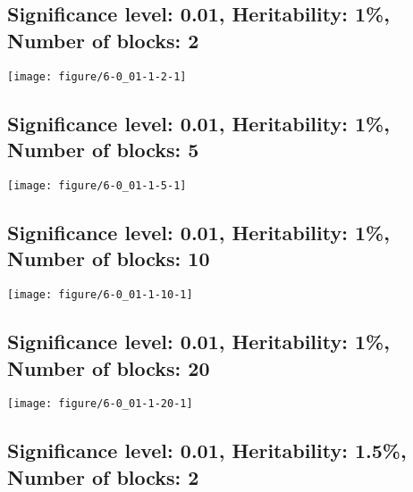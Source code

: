 \documentclass[11pt,letter]{article}\usepackage[]{graphicx}\usepackage[]{color}
\makeatletter
\def\maxwidth{ %
  \ifdim\Gin@nat@width>\linewidth
    \linewidth
  \else
    \Gin@nat@width
  \fi
}
\newenvironment{knitrout}{}{} %
\makeatother
\begin{document}
\newpage
\subsection{Significance level: 0.01, Heritability: 1\%, Number of blocks: 2}

\begin{knitrout}
\color{fgcolor}
\texttt{[image: figure/6-0\_01-1-2-1]} 

\end{knitrout}

\newpage
\subsection{Significance level: 0.01, Heritability: 1\%, Number of blocks: 5}

\begin{knitrout}
\color{fgcolor}
\texttt{[image: figure/6-0\_01-1-5-1]} 

\end{knitrout}

\newpage
\subsection{Significance level: 0.01, Heritability: 1\%, Number of blocks: 10}

\begin{knitrout}
\color{fgcolor}
\texttt{[image: figure/6-0\_01-1-10-1]} 

\end{knitrout}

\newpage
\subsection{Significance level: 0.01, Heritability: 1\%, Number of blocks: 20}

\begin{knitrout}
\color{fgcolor}
\texttt{[image: figure/6-0\_01-1-20-1]} 

\end{knitrout}

\newpage
\subsection{Significance level: 0.01, Heritability: 1.5\%, Number of blocks: 2}
\end{document}
